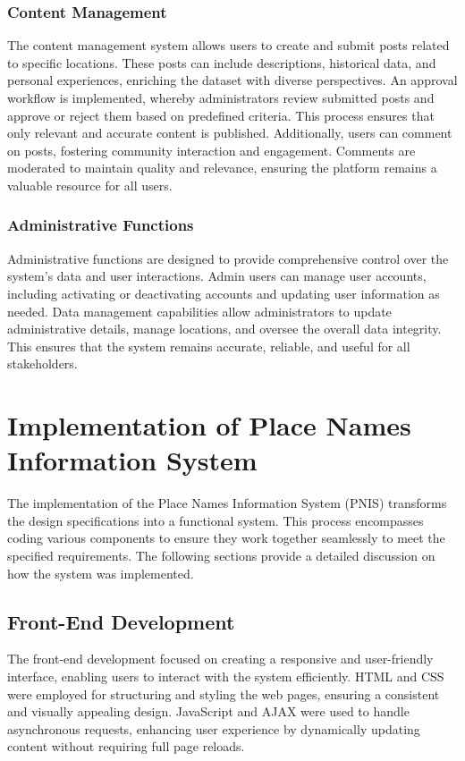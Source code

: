 \subsubsection{Content Management}
The content management system allows users to create and submit posts related to specific locations. These posts can include descriptions, historical data, and personal experiences, enriching the dataset with diverse perspectives. An approval workflow is implemented, whereby administrators review submitted posts and approve or reject them based on predefined criteria. This process ensures that only relevant and accurate content is published. Additionally, users can comment on posts, fostering community interaction and engagement. Comments are moderated to maintain quality and relevance, ensuring the platform remains a valuable resource for all users.

\subsubsection{Administrative Functions}
Administrative functions are designed to provide comprehensive control over the system's data and user interactions. Admin users can manage user accounts, including activating or deactivating accounts and updating user information as needed. Data management capabilities allow administrators to update administrative details, manage locations, and oversee the overall data integrity. This ensures that the system remains accurate, reliable, and useful for all stakeholders.


\section{Implementation of Place Names Information System}
The implementation of the Place Names Information System (PNIS) transforms the design specifications into a functional system. This process encompasses coding various components to ensure they work together seamlessly to meet the specified requirements. The following sections provide a detailed discussion on how the system was implemented.

\subsection{Front-End Development}
The front-end development focused on creating a responsive and user-friendly interface, enabling users to interact with the system efficiently. HTML and CSS were employed for structuring and styling the web pages, ensuring a consistent and visually appealing design. JavaScript and AJAX were used to handle asynchronous requests, enhancing user experience by dynamically updating content without requiring full page reloads.

